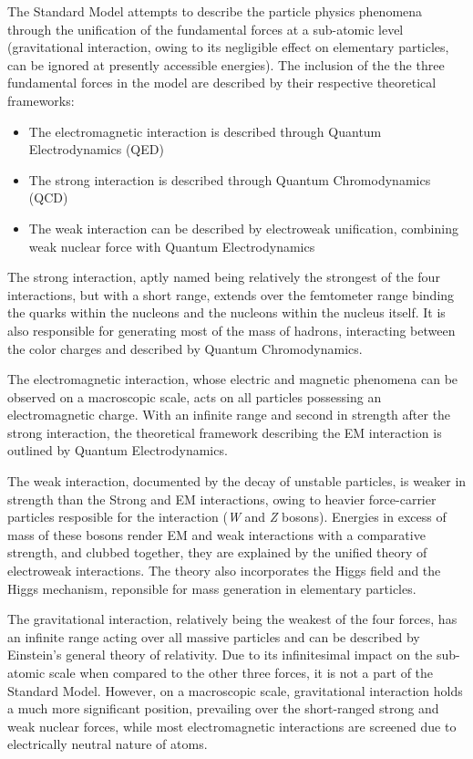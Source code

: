 The Standard Model attempts to describe the particle physics phenomena through the unification of the fundamental forces at a sub-atomic level
(gravitational interaction, owing to its negligible effect on elementary particles, can be ignored at presently accessible energies)\cite{ShawMartin:2017}.
The inclusion of the the three fundamental forces in the model are described by their respective theoretical frameworks:
\begin{itemize}
  \item The electromagnetic interaction is described through Quantum Electrodynamics (QED)
  \item The strong interaction is described through Quantum Chromodynamics (QCD)
  \item The weak interaction can be described by electroweak unification, combining weak nuclear force with Quantum Electrodynamics
\end{itemize}

The strong interaction, aptly named being relatively the strongest of the four interactions, but with a short range, extends over the femtometer range
binding the quarks within the nucleons and the nucleons within the nucleus itself. It is also responsible for generating most of the mass of hadrons,
interacting between the color charges and described by Quantum Chromodynamics.

The electromagnetic interaction, whose electric and magnetic phenomena can be observed on a macroscopic scale, acts on all particles possessing an
electromagnetic charge. With an infinite range and second in strength after the strong interaction, the theoretical framework describing the EM
interaction is outlined by Quantum Electrodynamics.

The weak interaction, documented by the decay of unstable particles, is weaker in strength than the Strong and EM interactions, owing to heavier
force-carrier particles resposible for the interaction (\textsl{W} and \textsl{Z} bosons). Energies in excess of mass of these bosons render EM and
weak interactions with a comparative strength, and clubbed together, they are explained by the unified theory of electroweak interactions. The theory
also incorporates the Higgs field and the Higgs mechanism, reponsible for mass generation in elementary particles.

The gravitational interaction, relatively being the weakest of the four forces, has an infinite range acting over all massive particles and can
be described by Einstein's general theory of relativity. Due to its infinitesimal impact on the sub-atomic scale when compared to the other three
forces, it is not a part of the Standard Model. However, on a macroscopic scale, gravitational interaction holds a much more
significant position, prevailing over the short-ranged strong and weak nuclear forces, while most electromagnetic interactions are screened due
to electrically neutral nature of atoms.

